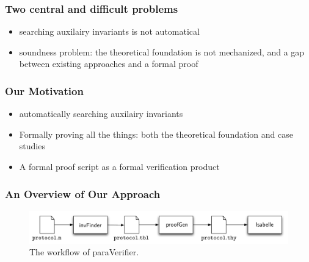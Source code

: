 \documentclass{beamer}
\begin{document}
\begin{frame}\frametitle{Two central and difficult problems}
\begin{itemize}
\item  searching auxilairy invariants is not automatical
\item  soundness problem: the theoretical foundation is not mechanized, and a gap between existing
approaches and a formal proof
\end{itemize}

\end{frame}

\begin{frame}\frametitle{Our Motivation}

\begin{itemize}
\item automatically searching  auxilairy invariants
\item Formally proving all the things: both the theoretical foundation and case studies
\item A formal proof script as a formal verification product
\end{itemize}
\end{frame}


\begin{frame}\frametitle{An Overview of Our Approach}


\begin{figure}[!t]
\centering %
\vspace{-0.8cm}
\includegraphics[width=1.0\textwidth]{paraVerifier.pdf}
\vspace{-0.6cm}
\caption{The workflow of {\sf paraVerifier}.}
\label{fig:arch}
\end{figure}
\end{frame}
\end{document}
